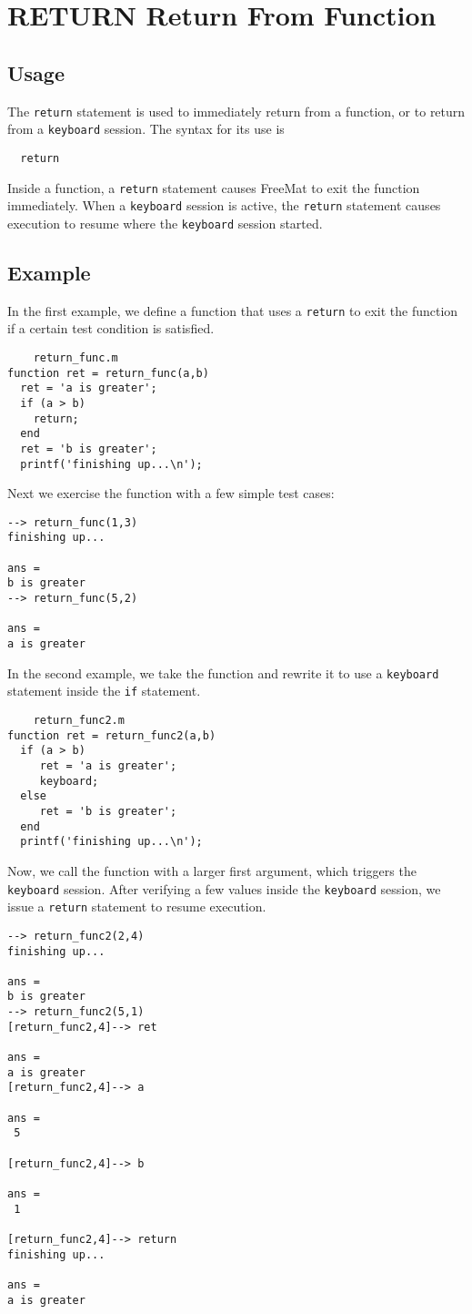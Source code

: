 \section{RETURN Return From Function}

\subsection{Usage}

The \verb|return| statement is used to immediately return from
a function, or to return from a \verb|keyboard| session.  The
syntax for its use is
\begin{verbatim}
  return
\end{verbatim}
Inside a function, a \verb|return| statement causes FreeMat
to exit the function immediately.  When a \verb|keyboard| session
is active, the \verb|return| statement causes execution to
resume where the \verb|keyboard| session started.
\subsection{Example}

In the first example, we define a function that uses a
\verb|return| to exit the function if a certain test condition
is satisfied.
\begin{verbatim}
    return_func.m
function ret = return_func(a,b)
  ret = 'a is greater';
  if (a > b)
    return;
  end
  ret = 'b is greater';
  printf('finishing up...\n');
\end{verbatim}
Next we exercise the function with a few simple test
cases:
\begin{verbatim}
--> return_func(1,3)
finishing up...

ans = 
b is greater
--> return_func(5,2)

ans = 
a is greater
\end{verbatim}
In the second example, we take the function and rewrite
it to use a \verb|keyboard| statement inside the \verb|if| statement.
\begin{verbatim}
    return_func2.m
function ret = return_func2(a,b)
  if (a > b)
     ret = 'a is greater';
     keyboard;
  else
     ret = 'b is greater';
  end
  printf('finishing up...\n');
\end{verbatim}
Now, we call the function with a larger first argument, which
triggers the \verb|keyboard| session.  After verifying a few
values inside the \verb|keyboard| session, we issue a \verb|return|
statement to resume execution.
\begin{verbatim}
--> return_func2(2,4)
finishing up...

ans = 
b is greater
--> return_func2(5,1)
[return_func2,4]--> ret

ans = 
a is greater
[return_func2,4]--> a

ans = 
 5 

[return_func2,4]--> b

ans = 
 1 

[return_func2,4]--> return
finishing up...

ans = 
a is greater
\end{verbatim}
